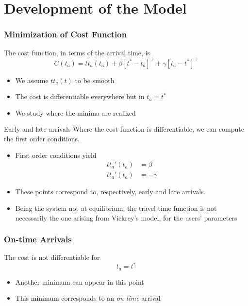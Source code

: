 \documentclass[hyperref={pdfpagelabels=false}]{beamer}
\begin{document}
\section{Development of the Model}

\begin{frame}
  \tableofcontents[currentsection]
\end{frame}

\begin{frame}
  \frametitle{Minimization of Cost Function}
  The cost function, in terms of the arrival time, is
    \begin{equation*}
      C(t_a) = tt_a(t_a) + \beta[t^*-t_a]^+ + \gamma[t_a-t^*]^+
    \end{equation*}
    \begin{itemize}
    \item We assume \(tt_a(t)\) to be smooth
    \item The cost is differentiable everywhere but in \(t_a = t^*\)
    \item We study where the minima are realized
    \end{itemize}
\end{frame}

\begin{frame}{Early and late arrivals}
  Where the cost function is differentiable, we can compute the first order conditions.
  \begin{itemize}
  \item First order conditions yield
    \begin{align*}
      tt_a'(t_a) & = \beta \\
      tt_a'(t_a) & = -\gamma
    \end{align*}
  \item These points correspond to, respectively, early and late arrivals.
  \item Being the system not at equilibrium, the travel time function is not necessarily the one arising from Vickrey's model, for the users' parameters
  \end{itemize}
\end{frame}

\begin{frame}
  \frametitle{On-time Arrivals}
  The cost is not differentiable for
  \begin{equation*}
    t_a = t^*
  \end{equation*}
  \begin{itemize}
  \item Another minimum can appear in this point
  \item This minimum corresponds to an \textit{on-time} arrival
  \end{itemize}
\end{frame}
\end{document}
